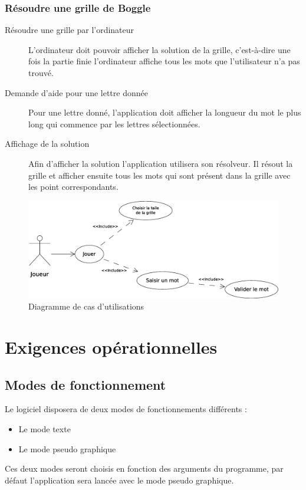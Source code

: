 \documentclass[12pt,a4paper,openany]{article}
\begin{document}
	\subsubsection{Résoudre une grille de Boggle}
		\begin{description}
			\item[Résoudre une grille par l'ordinateur] 
				L'ordinateur doit pouvoir afficher la solution de la grille, c'est-à-dire une fois la partie finie l'ordinateur affiche tous les mots
				que l'utilisateur n'a pas trouvé.
			\item[Demande d'aide pour une lettre donnée] Pour une lettre donné, l'application doit afficher la longueur du mot le plus long qui
				commence par les lettres sélectionnées.
			\item[Affichage de la solution] 
				Afin d'afficher la solution l'application utilisera son résolveur. Il résout la grille et afficher ensuite tous les mots qui sont
				présent dans la grille avec les point correspondants.
		\end{description}
		\begin{figure}[H]
			\centering
			\includegraphics[width=15cm]{usecase.eps}
			\caption{Diagramme de cas d'utilisations}
		\end{figure}

	\section{Exigences opérationnelles} 
	\subsection{Modes de fonctionnement}
	Le logiciel disposera de deux modes de fonctionnements différents :
	\begin{itemize}
		\item Le mode texte
		\item Le mode pseudo graphique
	\end{itemize}
	Ces deux modes seront choisis en fonction des arguments du programme, par défaut l'application sera lancée avec le mode pseudo graphique.
\end{document}
